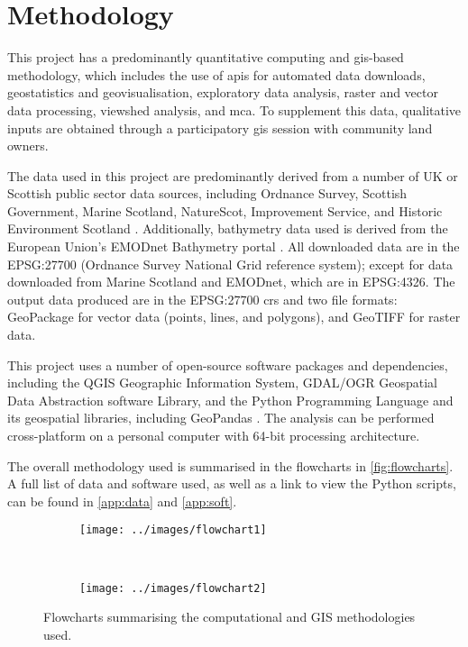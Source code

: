 \chapter{Methodology}

This project has a predominantly quantitative computing and \gls{gis}-based methodology, which includes the use of \glspl{api} for automated data downloads, geostatistics and geovisualisation, exploratory data analysis, raster and vector data processing, viewshed analysis, and \gls{mca}. To supplement this data, qualitative inputs are obtained through a participatory \gls{gis} session with community land owners.

The data used in this project are predominantly derived from a number of UK or Scottish public sector data sources, including Ordnance Survey, Scottish Government, Marine Scotland, NatureScot, Improvement Service, and Historic Environment Scotland \autocite{os-downloads,spatialdata}. Additionally, bathymetry data used is derived from the European Union's EMODnet Bathymetry portal \autocite{emodnet-bathymetry}. All downloaded data are in the EPSG:27700 (Ordnance Survey National Grid reference system); except for data downloaded from Marine Scotland and EMODnet, which are in EPSG:4326. The output data produced are in the EPSG:27700 \gls{crs} and two file formats: GeoPackage for vector data (points, lines, and polygons), and GeoTIFF for raster data.

This project uses a number of open-source software packages and dependencies, including the QGIS Geographic Information System, GDAL/OGR Geospatial Data Abstraction software Library, and the Python Programming Language and its geospatial libraries, including GeoPandas \autocite{qgis,gdal,python,geopandas}. The analysis can be performed cross-platform on a personal computer with 64-bit processing architecture.

The overall methodology used is summarised in the flowcharts in \autoref{fig:flowcharts}. A full list of data and software used, as well as a link to view the Python scripts, can be found in \autoref{app:data} and \autoref{app:soft}.

\begin{figure}
  \centering
  \begin{subfigure}[t]{.96\textwidth}
    \centering
    \texttt{[image: ../images/flowchart1]}
  \end{subfigure}
  \\
  \begin{subfigure}[t]{.96\textwidth}
    \centering
    \texttt{[image: ../images/flowchart2]}
  \end{subfigure}
  \caption{Flowcharts summarising the computational and GIS methodologies used. \label{fig:flowcharts}}
\end{figure}

